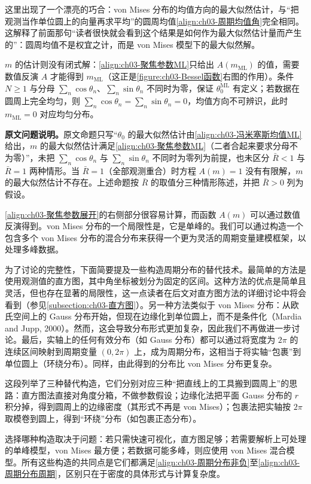 \documentclass[../../main.tex]{subfiles}
\begin{document}
\begin{remark}
这里出现了一个漂亮的巧合：von Mises 分布的均值方向的最大似然估计，与“把观测当作单位圆上的向量再求平均”的圆周均值\eqref{align:ch03-周期均值角}完全相同。这解释了前面那句“读者很快就会看到这个结果是如何作为最大似然估计量而产生的”：圆周均值不是权宜之计，而是 von Mises 模型下的最大似然解。

$m$ 的估计则没有闭式解：\eqref{align:ch03-聚焦参数ML}只给出 $A(m_{\mathrm{ML}})$ 的值，需要数值反演 $A$ 才能得到 $m_{\mathrm{ML}}$（这正是\cref{figure:ch03-Bessel函数}右图的作用）。条件 $N\geqslant1$ 与分母 $\sum_n\cos\theta_n$、$\sum_n\sin\theta_n$ 不同时为零，保证 $\theta_0^{\mathrm{ML}}$ 有定义；若数据在圆周上完全均匀，则 $\sum_n\cos\theta_n=\sum_n\sin\theta_n=0$，均值方向不可辨识，此时 $m_{\mathrm{ML}}=0$ 对应均匀分布。

\textbf{原文问题说明。}原文命题只写“$\theta_0$ 的最大似然估计由\eqref{align:ch03-冯米塞斯均值ML}给出，$m$ 的最大似然估计满足\eqref{align:ch03-聚焦参数ML}（二者合起来要求分母不为零）”，未把 $\sum_n\cos\theta_n$ 与 $\sum_n\sin\theta_n$ 不同时为零列为前提，也未区分 $\bar{R}<1$ 与 $\bar{R}=1$ 两种情形。当 $\bar{R}=1$（全部观测重合）时方程 $A(m)=1$ 没有有限解，$m$ 的最大似然估计不存在。上述命题按 $\bar{R}$ 的取值分三种情形陈述，并把 $\bar{R}>0$ 列为假设。
\end{remark}

\eqref{align:ch03-聚焦参数展开}的右侧部分很容易计算，而函数 $A(m)$ 可以通过数值反演得到。von Mises 分布的一个局限性是，它是单峰的。我们可以通过构造一个包含多个 von Mises 分布的混合分布来获得一个更为灵活的周期变量建模框架，以处理多峰数据。

为了讨论的完整性，下面简要提及一些构造周期分布的替代技术。最简单的方法是使用观测值的直方图，其中角坐标被划分为固定的区间。这种方法的优点是简单且灵活，但也存在显著的局限性，这一点读者在后文对直方图方法的详细讨论中将会看到（参见\cref{subsection:ch03-直方图}）。另一种方法类似于 von Mises 分布：从欧氏空间上的 Gauss 分布开始，但现在边缘化到单位圆上，而不是条件化（Mardia and Jupp, 2000）。然而，这会导致分布形式更加复杂，因此我们不再做进一步讨论。最后，实轴上的任何有效分布（如 Gauss 分布）都可以通过将宽度为 $2\pi$ 的连续区间映射到周期变量 $(0,2\pi)$ 上，成为周期分布，这相当于将实轴“包裹”到单位圆上（环绕分布）。同样，由此得到的分布比 von Mises 分布更复杂。

\begin{remark}
这段列举了三种替代构造，它们分别对应三种“把直线上的工具搬到圆周上”的思路：直方图法直接对角度分箱，不做参数假设；边缘化法把平面 Gauss 分布的 $r$ 积分掉，得到圆周上的边缘密度（其形式不再是 von Mises）；包裹法把实轴按 $2\pi$ 取模卷到圆上，得到“环绕”分布（如包裹正态分布）。

选择哪种构造取决于问题：若只需快速可视化，直方图足够；若需要解析上可处理的单峰模型，von Mises 最方便；若数据可能多峰，则应使用 von Mises 混合模型。所有这些构造的共同点是它们都满足\eqref{align:ch03-周期分布非负}至\eqref{align:ch03-周期分布周期}，区别只在于密度的具体形式与计算复杂度。
\end{remark}
\end{document}
